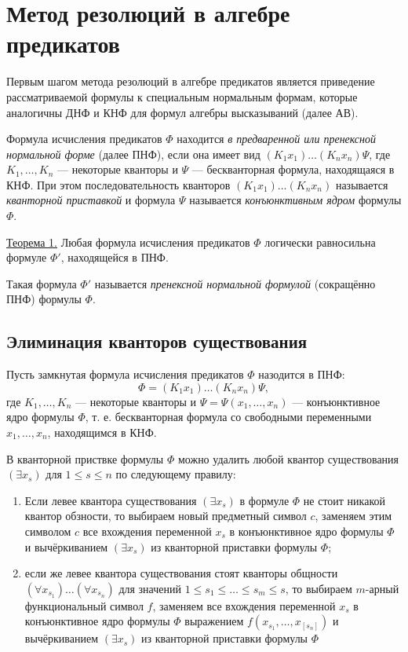 \section{Метод резолюций в алгебре предикатов}
Первым шагом метода резолюций в алгебре предикатов является приведение рассматриваемой формулы к специальным нормальным формам, которые аналогичны ДНФ и КНФ для формул алгебры высказываний (далее АВ).

Формула исчисления предикатов $\Phi$ находится {\it в предваренной или пренексной нормальной форме} (далее ПНФ), если она имеет вид $(K_1 x_1)\dots(K_n x_n)\Psi$, где $K_1,\dots,K_n$ --- некоторые кванторы и $\Psi$ --- бескванторная формула, находящаяся в КНФ. При этом последовательность кванторов $(K_1 x_1)\dots(K_n x_n)$ называется {\it кванторной приставкой} и формула $\Psi$ называется {\it конъюнктивным ядром} формулы $\Phi$.

\underline{Теорема 1.} Любая формула исчисления предикатов $\Phi$ логически равносильна формуле $\Phi'$, находящейся в ПНФ.

Такая формула $\Phi'$ называется {\it пренексной нормальной формулой} (сокращённо ПНФ) формулы $\Phi$.

\subsection{Элиминация кванторов существования}

Пусть замкнутая формула исчисления предикатов $\Phi$ назодится в ПНФ:
\begin{equation*}
    \Phi = (K_1 x_1)\dots(K_n x_n)\Psi,
\end{equation*}
где $K_1,\dots,K_n$ --- некоторые кванторы и $\Psi = \Psi(x_1,\dots,x_n)$ --- конъюнктивное ядро формулы $\Phi$, т. е. бескванторная формула со свободными переменными $x_1,\dots,x_n$, находящимся в КНФ.

В кванторной приствке формулы $\Phi$ можно удалить любой квантор существования $(\exists x_s)$ для $1 \leq s \leq n$ по следующему правилу:
\begin{enumerate}
    \item Если левее квантора существования $(\exists x_s)$ в формуле $\Phi$ не стоит никакой квантор обзности, то выбираем новый предметный символ $c$, заменяем этим символом $c$ все вхождения переменной $x_s$ в конъюнктивное ядро формулы $\Phi$ и вычёркиванием $(\exists x_s)$ из кванторной приставки формулы $\Phi$;
    \item если же левее квантора существования стоят кванторы общности $(\forall x_{s_1})\dots(\forall x_{s_n})$ для значений $1 \leq s_1 \leq \dots \leq s_m \leq s$, то выбираем $m$-арный функциональный символ $f$, заменяем все вхождения переменной $x_s$ в конъюнктивное ядро формулы $\Phi$ выражением $f(x_{s_1},\dots,x_[s_n])$ и вычёркиванием $(\exists x_s)$ из кванторной приставки формулы $\Phi$
\end{enumerate}

